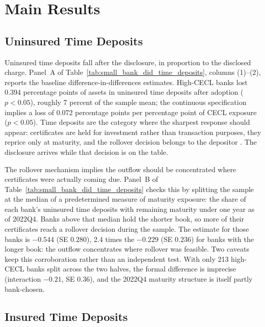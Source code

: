 \section{Main Results}
\label{sec:results}

\subsection{Uninsured Time Deposits}
\label{sec:results:uninsured}

Uninsured time deposits fall after the disclosure, in proportion to the
disclosed charge.  Panel~A of
Table~\ref{tab:small_bank_did_time_deposits},
columns (1)--(2), reports the baseline difference-in-differences
estimates.  High-CECL banks lost 0.394 percentage points of assets in
uninsured time deposits after adoption ($p<0.05$), roughly 7 percent of
the sample mean; the continuous specification implies a loss of 0.072
percentage points per percentage point of CECL exposure ($p<0.05$).
Time deposits are the category where the sharpest response should
appear: certificates are held for investment rather than transaction
purposes, they reprice only at maturity, and the rollover decision
belongs to the depositor \citep{calomiris1991role, iyer2016tale,
maechler2006dynamic, egan2017deposit}.  The disclosure arrives while
that decision is on the table.

The rollover mechanism implies the outflow should be concentrated
where certificates were actually coming due.  Panel~B of
Table~\ref{tab:small_bank_did_time_deposits} checks this by splitting
the sample at the median of a predetermined measure of maturity
exposure: the share of each bank's uninsured time deposits with
remaining maturity under one year as of 2022Q4.  Banks above that
median hold the shorter book, so more of their certificates reach a
rollover decision during the sample.  The estimate for those banks is
$-0.544$ (SE $0.280$), 2.4 times the $-0.229$
(SE $0.236$) for banks with the longer book: the outflow concentrates
where rollover was feasible.  Two caveats keep this corroboration rather
than an independent test.  With only 213 high-CECL banks split across
the two halves, the formal difference is imprecise (interaction
$-0.21$, SE $0.36$), and the 2022Q4 maturity structure is itself
partly bank-chosen.

\subsection{Insured Time Deposits}
\label{sec:results:insured}

